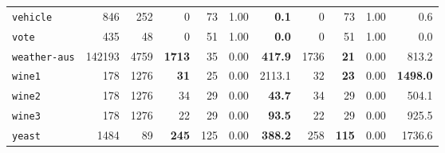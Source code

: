 \begin{tabular}{lccrrrrrrrr}
\texttt{vehicle} & \multicolumn{1}{r}{846} & \multicolumn{1}{r}{252}  & 0 & 73 & 1.00 & \textbf{0.1} & 0 & 73 & 1.00 & 0.6\\
\texttt{vote} & \multicolumn{1}{r}{435} & \multicolumn{1}{r}{48}  & 0 & 51 & 1.00 & \textbf{0.0} & 0 & 51 & 1.00 & 0.0\\
\texttt{weather-aus} & \multicolumn{1}{r}{142193} & \multicolumn{1}{r}{4759}  & \textbf{1713} & 35 & 0.00 & \textbf{417.9} & 1736 & \textbf{21} & 0.00 & 813.2\\
\texttt{wine1} & \multicolumn{1}{r}{178} & \multicolumn{1}{r}{1276}  & \textbf{31} & 25 & 0.00 & 2113.1 & 32 & \textbf{23} & 0.00 & \textbf{1498.0}\\
\texttt{wine2} & \multicolumn{1}{r}{178} & \multicolumn{1}{r}{1276}  & 34 & 29 & 0.00 & \textbf{43.7} & 34 & 29 & 0.00 & 504.1\\
\texttt{wine3} & \multicolumn{1}{r}{178} & \multicolumn{1}{r}{1276}  & 22 & 29 & 0.00 & \textbf{93.5} & 22 & 29 & 0.00 & 925.5\\
\texttt{yeast} & \multicolumn{1}{r}{1484} & \multicolumn{1}{r}{89}  & \textbf{245} & 125 & 0.00 & \textbf{388.2} & 258 & \textbf{115} & 0.00 & 1736.6\\
\bottomrule
\end{tabular}
